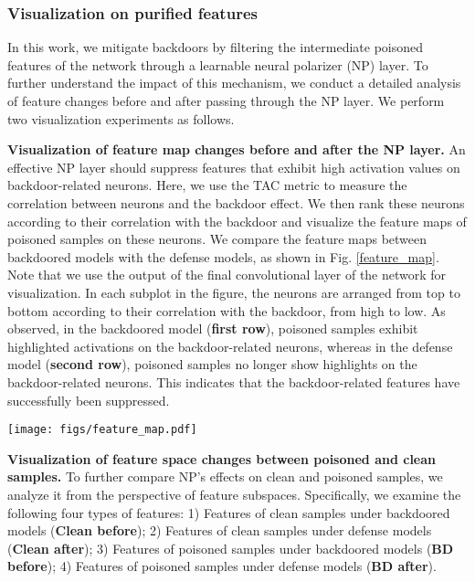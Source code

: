 
\subsubsection{Visualization on purified features}
In this work, we mitigate backdoors by filtering the intermediate poisoned features of the network through a learnable neural polarizer (NP) layer. To further understand the impact of this mechanism, we conduct a detailed analysis of feature changes before and after passing through the NP layer. We perform two visualization experiments as follows.

\textbf{Visualization of feature map changes before and after the NP layer.}
An effective NP layer should suppress features that exhibit high activation values on backdoor-related neurons. Here, we use the TAC metric \cite{zheng2022data} to measure the correlation between neurons and the backdoor effect. We then rank these neurons according to their correlation with the backdoor and visualize the feature maps of poisoned samples on these neurons. We compare the feature maps between backdoored models with the defense models, as shown in Fig. \ref{feature_map}. Note that we use the output of the final convolutional layer of the network for visualization. In each subplot in the figure, the neurons are arranged from top to bottom according to their correlation with the backdoor, from high to low. As observed, in the backdoored model (\textbf{first row}), poisoned samples exhibit highlighted activations on the backdoor-related neurons, whereas in the defense model (\textbf{second row}), poisoned samples no longer show highlights on the backdoor-related neurons. This indicates that the backdoor-related features have successfully been suppressed.

\begin{figure*}[h]
    \centering
    \texttt{[image: figs/feature\_map.pdf]}
    \caption{Feature maps of poisoned samples in the final convolutional layer of PreAct-ResNet18 network, with and without the neural polarizer layer, on CIFAR-10 dataset.}
    \label{feature_map}
\end{figure*}

\textbf{Visualization of feature space changes between poisoned and clean samples.}
To further compare NP's effects on clean and poisoned samples, we analyze it from the perspective of feature subspaces. Specifically, we examine the following four types of features: 1) Features of clean samples under backdoored models (\textbf{Clean before}); 2) Features of clean samples under defense models (\textbf{Clean after}); 3) Features of poisoned samples under backdoored models (\textbf{BD before}); 4) Features of poisoned samples under defense models (\textbf{BD after}).


